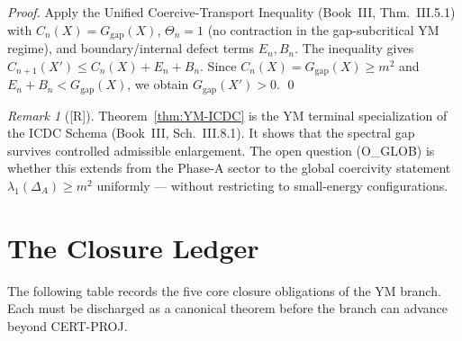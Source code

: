 \documentclass[12pt,oneside]{amsbook}
\theoremstyle{plain}
\theoremstyle{definition}
\theoremstyle{remark}
\newtheorem{remark}[theorem]{Remark}
\newcommand{\status}[1]{\textup{[#1]}}
\begin{document}
\begin{proof}
Apply the Unified Coercive-Transport Inequality (Book~III,
Thm.~III.5.1) with $C_n(X) = G_{\mathrm{gap}}(X)$,
$\Theta_n = 1$ (no contraction in the gap-subcritical YM regime),
and boundary/internal defect terms $E_n, B_n$. The inequality
gives $C_{n+1}(X') \leq C_n(X) + E_n + B_n$. Since
$C_n(X) = G_{\mathrm{gap}}(X) \geq m^2$ and $E_n + B_n <
G_{\mathrm{gap}}(X)$, we obtain $G_{\mathrm{gap}}(X') > 0$.
\qed
\end{proof}

\begin{remark}[\status{R}]
Theorem~\ref{thm:YM-ICDC} is the YM terminal specialization of
the ICDC Schema (Book~III, Sch.~III.8.1). It shows that the
spectral gap survives controlled admissible enlargement. The
open question (O\_GLOB) is whether this extends from the Phase-A
sector to the global coercivity statement $\lambda_1(\Delta_A)
\geq m^2$ uniformly --- without restricting to small-energy
configurations.
\end{remark}

\section{The Closure Ledger}
\label{sec:closure-ledger}

The following table records the five core closure obligations of
the YM branch. Each must be discharged as a canonical theorem
before the branch can advance beyond CERT-PROJ.
\end{document}

